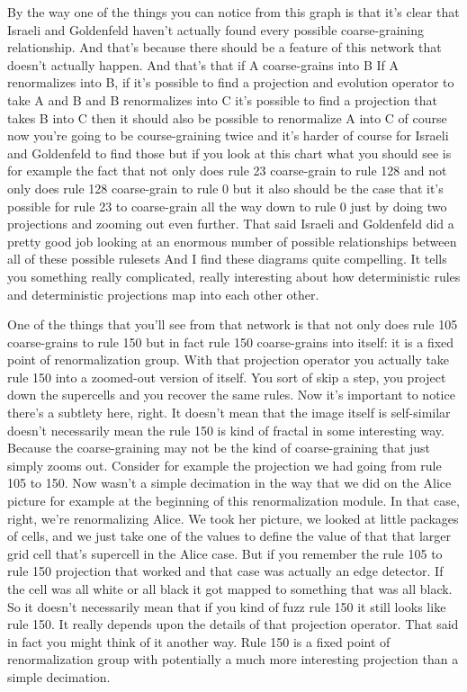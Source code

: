 \documentclass[]{article}
\begin{document}
By the way one of the things you
can notice from this graph
is that it's clear that
Israeli and Goldenfeld
haven't actually found every possible
coarse-graining relationship.
And that's because there should be a
feature of this network
that doesn't actually happen.
And that's that if A coarse-grains into B
If A renormalizes into B,
if it's possible to find a projection
and evolution operator to take A and B
and B renormalizes into C
it's possible to find a projection that takes B into C
then it should also be possible
to renormalize A into C
of course now you're going
to be course-graining twice
and it's harder of course for
Israeli and Goldenfeld to find those
but if you look at this chart
what you should see
is for example the fact that not only
does rule 23 coarse-grain to rule 128
and not only does rule 128
coarse-grain to rule 0
but it also should be the case
that it's possible for rule 23
to coarse-grain all the way down to rule 0
just by doing two projections
and zooming out even further.
That said Israeli and Goldenfeld did a pretty good job
looking at an enormous number of possible
relationships between all of these possible rulesets
And I find these diagrams quite compelling.
It tells you something really complicated,
really interesting about how
deterministic rules
and deterministic projections
map into each other other.

One of the things that you'll see from that network is that not only does rule 105
coarse-grains to rule 150 but in fact rule 150 coarse-grains into itself:
it is a fixed point of renormalization group. With that projection operator you actually take rule 150 into a zoomed-out version of itself.
You sort of skip a step, you project down the supercells and you recover the same rules.
Now it's important to notice there's a subtlety here, right.
It doesn't mean that the image itself is self-similar doesn't necessarily mean the rule 150 is kind of fractal in some interesting way.
Because the coarse-graining may not be the kind of coarse-graining that just simply zooms out.
Consider for example the projection we had going from rule 105 to 150.
Now wasn't a simple decimation in the way that we did on the Alice picture for example at the beginning of this renormalization module.
In that case, right, we're renormalizing Alice.
We took her picture, we looked at little packages of cells, and we just take one of the values to define the value of that that larger grid cell that's supercell in the Alice case.
But if you remember the rule 105 to rule 150 projection that worked and that case
was actually an edge detector.
If the cell was all white or all black it got mapped to something that was all black.
So it doesn't necessarily mean that if you kind of fuzz rule 150 it still looks like rule 150.
It really depends upon the details of that projection operator.
That said in fact you might think of it another way.
Rule 150 is a fixed point of renormalization group with potentially a much more interesting projection than a simple decimation.
\end{document}
